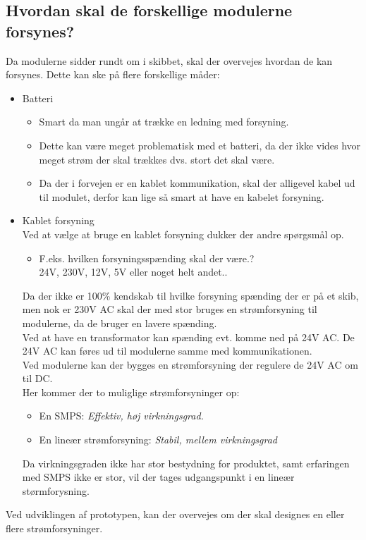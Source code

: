 \subsection{Hvordan skal de forskellige modulerne forsynes?}
Da modulerne sidder rundt om i skibbet, skal der overvejes hvordan de kan forsynes. Dette kan ske på flere forskellige måder:
\begin{itemize}
\item Batteri
	\begin{itemize}
	\item Smart da man ungår at trække en ledning med forsyning.
	\item Dette kan være meget problematisk med et batteri, da der ikke vides hvor meget strøm der skal trækkes dvs. stort det skal være. 
	\item Da der i forvejen er en kablet kommunikation, skal der alligevel kabel ud til modulet, derfor kan lige så smart at have en kabelet forsyning.
	\end{itemize}
\item Kablet forsyning \\
Ved at vælge at bruge en kablet forsyning dukker der andre spørgsmål op.
\begin{itemize}
\item F.eks. hvilken forsyningsspænding skal der være.?\\
24V, 230V, 12V, 5V eller noget helt andet..
\end{itemize}
Da der ikke er 100\% kendskab til hvilke forsyning spænding der er på et skib, men nok er 230V AC skal der med stor bruges en strømforsyning til modulerne, da de bruger en lavere spænding. \\
Ved at have en transformator kan spænding evt. komme ned på 24V AC. De 24V AC kan føres ud til modulerne samme med kommunikationen. \\
Ved modulerne kan der bygges en strømforsyning der regulere de 24V AC om til DC. \\
Her kommer der to muliglige strømforsyninger op:
\begin{itemize}
\item En SMPS: \textit{Effektiv, høj virkningsgrad.}
\item En lineær strømforsyning: \textit{Stabil, mellem virkningsgrad}
\end{itemize}
Da virkningsgraden ikke har stor bestydning for produktet, samt erfaringen med SMPS ikke er stor, vil der tages udgangspunkt i en lineær størmforysning.
\end{itemize}
Ved udviklingen af prototypen, kan der overvejes om der skal designes en eller flere strømforsyninger.

